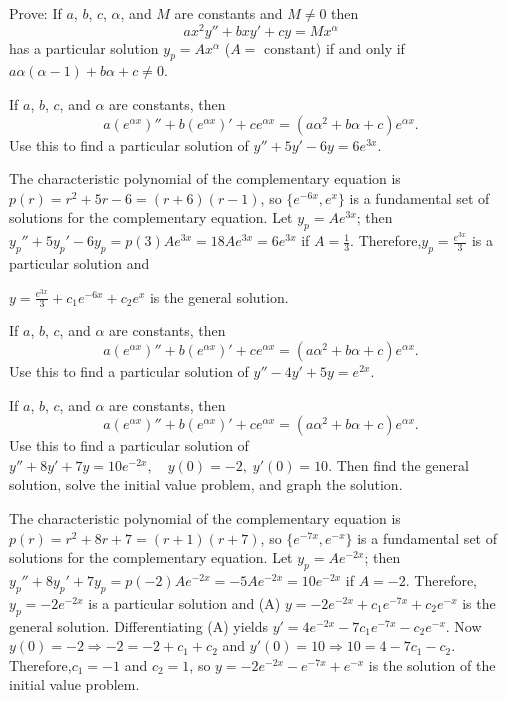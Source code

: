\documentclass{ximera}
\begin{document}
\begin{problem}\label{exer:5.3.15}
Prove: If $a$, $b$, $c$, $\alpha$, and $M$ are constants and
$M\ne0$ then
$$
ax^2y''+bxy'+cy=M x^\alpha
$$
has a particular solution $y_p=Ax^\alpha$ ($A=$ constant)
 if and only if $a\alpha(\alpha-1)+b\alpha+c\ne0$.
\end{problem}



\begin{problem}\label{exer:5.3.16} 
If $a$, $b$, $c$, and $\alpha$ are constants, then
$$
a(e^{\alpha x})''+b(e^{\alpha x})'+ce^{\alpha x}=(a\alpha^2+b\alpha+c)e^{\alpha
x}.
$$
Use this to find a
particular solution of $y''+5y'-6y=6e^{3x}$.
\begin{solution}
The characteristic polynomial of the complementary equation is
$p(r)=r^2+5r-6=(r+6)(r-1)$, so
 $\{e^{-6x},e^{x}\}$
is a fundamental set of solutions for the complementary equation.
Let $y_p=Ae^{3x}$; then
$y_p''+5y_p'-6y_p=p(3)Ae^{3x}=18Ae^{3x}=6e^{3x}$ if
$A=\frac{1}{3}$.
Therefore,$y_p=\frac{e^{3x}}{3}$ is a particular solution and

$y=\frac{e^{3x}}{3}+c_1e^{-6x}+c_2e^{x}$ is the general solution.
\end{solution}
\end{problem}

\begin{problem}\label{exer:5.3.17} 
If $a$, $b$, $c$, and $\alpha$ are constants, then
$$
a(e^{\alpha x})''+b(e^{\alpha x})'+ce^{\alpha x}=(a\alpha^2+b\alpha+c)e^{\alpha
x}.
$$
Use this to find a
particular solution of $y''-4y'+5y=e^{2x}$.
\end{problem}

\begin{problem}\label{exer:5.3.18} 
If $a$, $b$, $c$, and $\alpha$ are constants, then
$$
a(e^{\alpha x})''+b(e^{\alpha x})'+ce^{\alpha x}=(a\alpha^2+b\alpha+c)e^{\alpha
x}.
$$
Use this to find a
particular solution of $y''+8y'+7y=10e^{-2x}, \quad  y(0)=-2,\;
y'(0)=10$. Then find the general solution, solve the initial value problem,
and graph the solution.
\begin{solution}
The characteristic polynomial of the complementary equation is
$p(r)=r^2+8r+7=(r+1)(r+7)$, so
 $\{e^{-7x},e^{-x}\}$
is a fundamental set of solutions for the complementary equation.
Let $y_p=Ae^{-2x}$; then
$y_p''+8y_p'+7y_p=p(-2)Ae^{-2x}=-5Ae^{-2x}=10e^{-2x}$ if $A=-2$.
Therefore,$y_p=-2e^{-2x}$ is a particular solution  and
(A) $y=-2e^{-2x}+c_1e^{-7x}+c_2e^{-x}$ is the general solution.
Differentiating (A) yields
 $y'=4e^{-2x}-7c_1e^{-7x}-c_2e^{-x}$.
Now $y(0)=-2 \Rightarrow -2=-2+c_1+c_2$ and $y'(0)=10\Rightarrow
10=4-7c_1-c_2$. Therefore,$c_1=-1$ and $c_2=1$, so
$y=-2e^{-2x}-e^{-7x}+e^{-x}$
 is the solution of the initial value problem.

\end{solution}
\end{problem}
\end{document}
